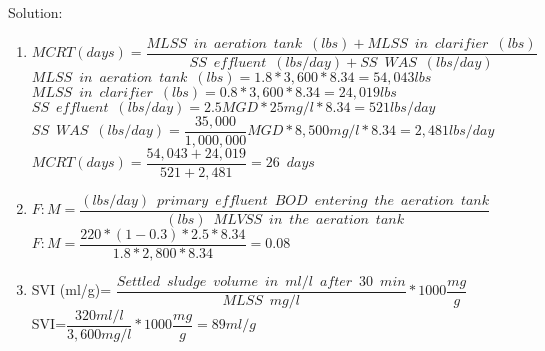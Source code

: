 \documentclass{article}
\begin{document}
\begin{enumerate}
Solution:\\
\vspace{0.3cm}
\begin{enumerate}
\item $MCRT (days) =  \dfrac{MLSS \enspace in \enspace aeration \enspace tank \enspace (lbs)+MLSS \enspace in \enspace clarifier \enspace (lbs)}{SS \enspace effluent \enspace (lbs/day)+SS \enspace WAS \enspace (lbs/day)}$\\
\vspace{0.3cm} 
$MLSS \enspace in \enspace aeration \enspace tank \enspace (lbs)=1.8*3,600*8.34=54,043lbs$\\
\vspace{0.3cm} 
$MLSS \enspace in \enspace clarifier \enspace (lbs)=0.8*3,600*8.34=24,019lbs$\\
\vspace{0.3cm} 
$SS \enspace effluent \enspace (lbs/day)=2.5MGD *25mg/l*8.34=521lbs/day$\\
\vspace{0.3cm} 
$SS \enspace WAS \enspace (lbs/day)=\dfrac{35,000}{1,000,000}MGD *8,500mg/l*8.34=2,481lbs/day$\\
\vspace{0.3cm} 
$MCRT (days) =  \dfrac{54,043+24,019}{521+2,481}=\boxed{26 \enspace days}$\\
\vspace{0.2cm}
\item $F:M=\dfrac{(lbs/day) \enspace primary \enspace effluent  \enspace BOD \enspace entering \enspace the  \enspace aeration \enspace tank}{(lbs) \enspace MLVSS \enspace in \enspace the  \enspace aeration \enspace tank}$\\
\vspace{0.3cm}
$F:M=\dfrac{220*(1-0.3)*2.5*8.34}{1.8*2,800*8.34}=\boxed{0.08}$\\
\vspace{0.5cm}

\item SVI (ml/g)= $\dfrac{Settled \enspace sludge \enspace volume \enspace in \enspace ml/l \enspace after \enspace 30 \enspace min}{MLSS \enspace mg/l}*1000 \dfrac{mg}{g}$\\
\vspace{0.5cm}
SVI=$\dfrac{320ml/l}{3,600mg/l}*1000\dfrac{mg}{g}=\boxed{89ml/g}$
\end{enumerate}


\end{enumerate}
\end{document}
